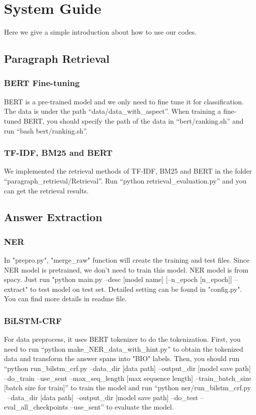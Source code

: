 \section{System Guide}
\label{sec:readme}

Here we give a simple introduction about how to use our codes.

\subsection{Paragraph Retrieval}
\subsubsection{BERT Fine-tuning}
BERT is a pre-trained model and we only need to fine tune it for classification.
The data is under the path ``data/data\_with\_aspect''. 
When training a fine-tuned BERT, you should specify the path of the data in ``bert/ranking.sh'' and run ``bash bert/ranking.sh''.
\subsubsection{TF-IDF, BM25 and BERT}
We implemented the retrieval methods of TF-IDF, BM25 and BERT in the folder ``paragraph\_retrieval/Retrieval''.
Run ``python retrieval\_evaluation.py'' and you can get the retrieval results.
\subsection{Answer Extraction}
\subsubsection{NER}
In "prepro.py", "merge\_raw" function will create the training and test files. Since NER model is pretrained, we don't need to train this model. NER model is from spacy. Just run "python main.py --desc [model name] [--n\_epoch [n\_epoch]] --extract" to test model on test set. Detailed setting can be found in "config.py". You can find more details in readme file.
\subsubsection{BiLSTM-CRF}
For data preprocess, it uses BERT tokenizer to do the tokenization.
First, you need to run ``python make\_NER\_data\_with\_hint.py'' to obtain the tokenized data and transform the answer spans into "BIO" labels.
Then, you should run ``python run\_bilstm\_crf.py  --data\_dir [data path]  --output\_dir [model save path] --do\_train  --use\_sent --max\_seq\_length [max sequence length] --train\_batch\_size [batch size for train]'' to train the model and run ``python ner/run\_bilstm\_crf.py \
    --data\_dir [data path] --output\_dir [model save path]     --do\_test     --eval\_all\_checkpoints     --use\_sent'' to evaluate the model.
